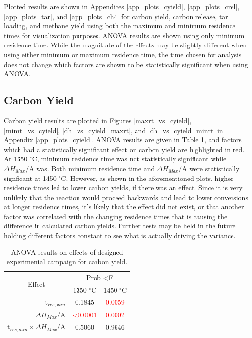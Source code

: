 \documentclass[11pt,twocolumn]{article}
\begin{document}
Plotted results are shown in Appendices \ref{app_plots_cyield}, \ref{app_plots_crel}, \ref{app_plots_tar}, and \ref{app_plots_ch4} for carbon yield, carbon release, tar loading, and methane yield using both the maximum and minimum residence times for visualization purposes.  ANOVA results are shown using only minimum residence time.  While the magnitude of the effects may be slightly different when using either minimum or maximum residence time, the time chosen for analysis does not change which factors are shown to be statistically significant when using ANOVA.


\subsection*{Carbon Yield}

Carbon yield results are plotted in Figures \ref{maxrt_vs_cyield}, \ref{minrt_vs_cyield}, \ref{dh_vs_cyield_maxrt}, and \ref{dh_vs_cyield_minrt} in Appendix \ref{app_plots_cyield}.  ANOVA results are given in Table \ref{anova_cyield}, and factors which had a statistically significant effect on carbon yield are highlighted in red.  At 1350 $^\circ$C, minimum residence time was not statistically significant while $\Delta H_{Max}$/A was.  Both minimum residence time and $\Delta H_{Max}$/A were statistically signficant at 1450 $^\circ$C.  However, as shown in the aforementioned plots, higher residence times led to lower carbon yields, if there was an effect.  Since it is very unlikely that the reaction would proceed backwards and lead to lower conversions at longer residence times, it's likely that the effect did not exist, or that another factor was correlated with the changing residence times that is causing the difference in calculated carbon yields.  Further tests may be held in the future holding different factors constant to see what is actually driving the variance.

\begin{table}
	\centering
	\caption{ANOVA results on effects of designed experimental campaign for carbon yield.}
	\begin{tabular}{r c c}
		\toprule
		\multicolumn{1}{c}{\multirow{2}{*}{Effect}}		& 	\multicolumn{2}{c}{Prob \textless F	}	\\
		{}								&	1350 $^\circ$C					&	1450 $^\circ$C			\\
		\midrule
		t$_{res,min}$						&	0.1845						&	\textcolor{red}{0.0059}	\\
		$\Delta H_{Max}$/A					&	\textcolor{red}{\textless 0.0001}	&	\textcolor{red}{0.0002}	\\
		t$_{res,min}\times \Delta H_{Max}$/A	&	0.5060						&	0.9646				\\
		\bottomrule
	\end{tabular}
	\label{anova_cyield}
\end{table}
\end{document}
